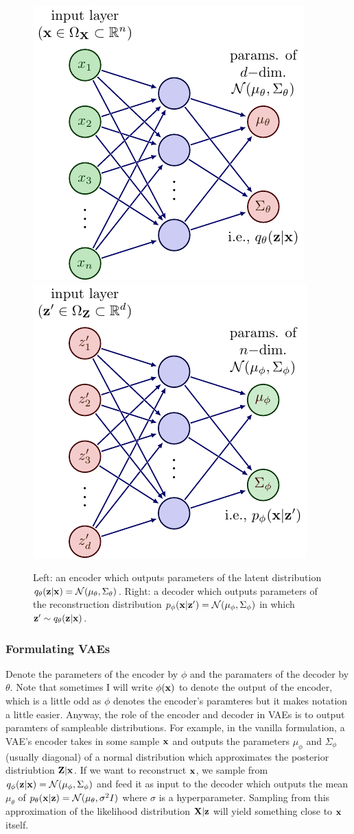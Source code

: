 \documentclass[11pt]{article}
\begin{document}
\begin{figure}
    \centering
    \includegraphics[width=0.46\linewidth]{figures/neural_nets/VAE_encoder.pdf}
    \hspace{20pt}
    \includegraphics[width=0.46\linewidth]{figures/neural_nets/VAE_decoder.pdf}
    \caption{Left: an encoder which outputs parameters of the latent distribution $q_{\theta}(\mathbf{z}|\mathbf{x})=\mathcal{N}(\mu_{\theta},\Sigma_{\theta})$. Right: a decoder which outputs parameters of the reconstruction distribution $p_{\phi}(\mathbf{x}|\mathbf{z}')=\mathcal{N}(\mu_{\phi},\Sigma_{\phi})$ in which $\mathbf{z}'\sim q_{\theta}(\mathbf{z}|\mathbf{x})$.}
    \label{fig:VAE_architecture}
\end{figure}

\subsubsection{Formulating VAEs}
Denote the parameters of the encoder by $\phi$ and the paramaters of the decoder by $\theta$. Note that sometimes I will write $\phi(\mathbf{x})$ to denote the output of the encoder, which is a little odd as $\phi$ denotes the encoder's paramteres but it makes notation a little easier. Anyway, the role of the encoder and decoder in VAEs is to output paramters of sampleable distributions. For example, in the vanilla formulation, a VAE's encoder takes in some sample $\mathbf{x}$ and outputs the parameters $\mu_{\phi}$ and $\Sigma_{\phi}$ (usually diagonal) of a normal distribution which approximates the posterior distriubtion $\mathbf{Z}|\mathbf{x}$. If we want to reconstruct $\mathbf{x}$, we sample from $q_{\phi}(\mathbf{z}|\mathbf{x})=\mathcal{N}(\mu_{\phi}, \Sigma_{\phi})$ and feed it as input to the decoder which outputs the mean $\mu_{\theta}$ of $p_{\theta}(\mathbf{x}|\mathbf{z})=\mathcal{N}(\mu_{\theta},\sigma^2 I)$ where $\sigma$ is a hyperparameter. Sampling from this approximation of the likelihood distribution $\mathbf{X}|\mathbf{z}$ will yield something close to $\mathbf{x}$ itself.
\end{document}

